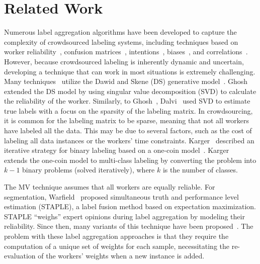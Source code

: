 \documentclass[sn-nature]{bst/sn-jnl}
\begin{document}
\section{Related Work}\label{sec:crowd.relatedwork}
Numerous label aggregation algorithms have been developed to capture the complexity of crowdsourced labeling systems, including techniques based on worker reliability~\cite{bi_Learning_2014,demartini_Zencrowd_2012}, confusion matrices~\cite{raykar_Learning_2010,zhang_Spectral_2014}, intentions~\cite{bi_Learning_2014,kurve_MultiCategory_2015}, biases~\cite{zhang_Imbalanced_2013,hernandez-gonzalez_Note_2019, welinder_Multidimensional_2010}, and correlations~\cite{ma_Gradient_2020}. However, because crowdsourced labeling is inherently dynamic and uncertain, developing a technique that can work in most situations is extremely challenging. Many techniques~\cite{liu_Variational_2012,karger_Budget_2014,raykar_Learning_2010,dalvi_Aggregating_2013,ghosh_Who_2011} utilize the Dawid and Skene (DS) generative model~\cite{dawid_Maximum_1979}. Ghosh~\cite{ghosh_Who_2011} extended the DS model by using singular value decomposition (SVD) to calculate the reliability of the worker. Similarly, to Ghosh~\cite{ghosh_Who_2011}, Dalvi~\cite{dalvi_Aggregating_2013} used SVD to estimate true labels with a focus on the sparsity of the labeling matrix. In crowdsourcing, it is common for the labeling matrix to be sparse, meaning that not all workers have labeled all the data. This may be due to several factors, such as the cost of labeling all data instances or the workers' time constraints. Karger~\cite{karger_Budget_2014} described an iterative strategy for binary labeling based on a one-coin model~\cite{ghosh_Who_2011}. Karger~\cite{karger_Budget_2014} extends the one-coin model to multi-class labeling by converting the problem into $k-1 $ binary problems (solved iteratively), where $k $ is the number of classes.

The MV technique assumes that all workers are equally reliable. For segmentation, Warfield~\cite{warfield_Simultaneous_2004} proposed simultaneous truth and performance level estimation (STAPLE), a label fusion method based on expectation maximization. STAPLE ``weighs'' expert opinions during label aggregation by modeling their reliability. Since then, many variants of this technique have been proposed~\cite{winzeck_ISLES_2018,commowick_Objective_2018,asman_Robust_2011,asman_Formulating_2012, eugenioiglesias_Unified_2013, jorgecardoso_STEPS_2013,asman_NonLocal_2013,akhondi-asl_Logarithmic_2014}. The problem with these label aggregation approaches is that they require the computation of a unique set of weights for each sample, necessitating the re-evaluation of the workers' weights when a new instance is added.
\end{document}
